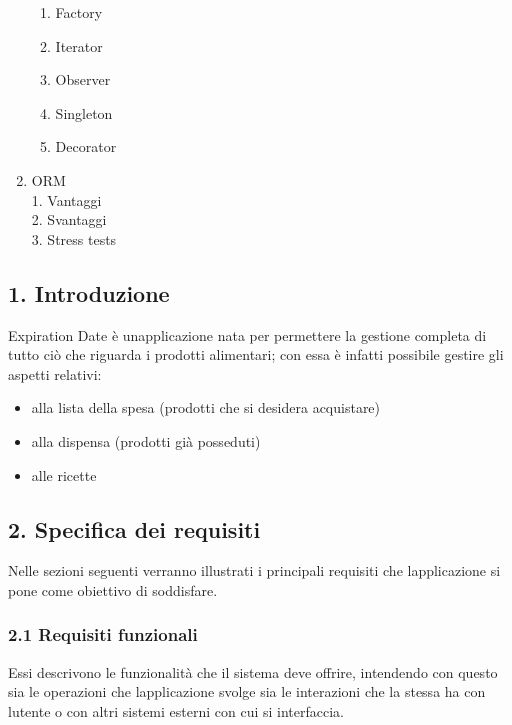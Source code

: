 \documentclass[
]{article}
\providecommand{\tightlist}{%
  \setlength{\itemsep}{0pt}\setlength{\parskip}{0pt}}
\begin{document}
\begin{enumerate}
  \begin{enumerate}
  \tightlist
  \item
    Factory
  \item
    Iterator
  \item
    Observer
  \item
    Singleton
  \item
    Decorator
  \end{enumerate}
\item
  ORM\\
  1. Vantaggi\\
  2. Svantaggi\\
  3. Stress tests
\end{enumerate}

\subsection{1. Introduzione}\label{introduzione}

Expiration Date è un\textquotesingle applicazione nata per permettere la
gestione completa di tutto ciò che riguarda i prodotti alimentari; con
essa è infatti possibile gestire gli aspetti relativi:

\begin{itemize}
\tightlist
\item
  alla lista della spesa (prodotti che si desidera acquistare)
\item
  alla dispensa (prodotti già posseduti)
\item
  alle ricette
\end{itemize}

\subsection{2. Specifica dei requisiti}\label{specifica-dei-requisiti}

Nelle sezioni seguenti verranno illustrati i principali requisiti che
l\textquotesingle applicazione si pone come obiettivo di soddisfare.

\subsubsection{2.1 Requisiti funzionali}\label{requisiti-funzionali}

Essi descrivono le funzionalità che il sistema deve offrire, intendendo
con questo sia le operazioni che l\textquotesingle applicazione svolge
sia le interazioni che la stessa ha con l\textquotesingle utente o con
altri sistemi esterni con cui si interfaccia.
\end{document}

